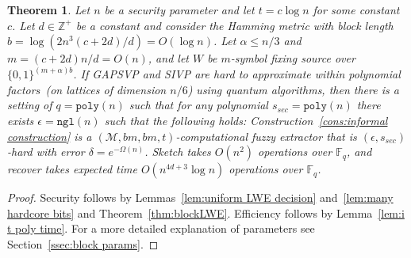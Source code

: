 \documentclass[11pt]{article}
\newcommand{\secref}[1]{\mbox{Section~\ref{#1}}}
\newcommand{\thref}[1]{\mbox{Theorem~\ref{#1}}}
\newcommand{\lemref}[1]{\mbox{Lemma~\ref{#1}}}
\newcommand{\consref}[1]{\mbox{Construction~\ref{#1}}}
\newcommand{\zo}{\ensuremath{\{0, 1\}}}
\newcommand{\Fq}{\ensuremath{\mathbb{F}_q}}
\newcommand{\poly}{\ensuremath{\mathtt{poly}}\xspace}
\newcommand{\ngl}{\ensuremath{\mathtt{ngl}}\xspace}
\newtheorem{theorem}{Theorem}[section]
\newcommand{\M}{\mathcal{M}}
\begin{document}
\begin{theorem}
\label{thm:lossless block sketch log}
Let $n$ be a security parameter and let $t = c\log n$ for some constant $c$.  Let $d\in\mathbb{Z}^+$ be a constant and consider the Hamming metric with block length $b = \log (2n^3 (c+2d)/d) = O(\log n)$.  Let $\alpha \leq n/3$ and $m=(c+2d)n/d = O(n)$, and let $W$ be $m$-symbol fixing source over $\zo^{(m+\alpha)b}$.  If GAPSVP and SIVP are hard to approximate within polynomial factors~(on lattices of dimension $n/6$) using quantum algorithms, then  there is a setting of $q = \poly(n)$ such that for any polynomial $s_{sec} = \poly(n)$
 there exists $\epsilon = \ngl(n)$ such that the following holds: 
\consref{cons:informal construction} is a $(\M, bm, bm, t)$-computational fuzzy extractor that is $(\epsilon, s_{sec})$-hard with error $\delta = e^{-\Omega(n)}$. Sketch takes $O(n^2)$ operations over $\Fq$, and recover takes expected time $O(n^{4d+3} \log n)$ operations over $\Fq$.
\end{theorem}

\begin{proof} Security follows by Lemmas~\ref{lem:uniform LWE decision} and~\ref{lem:many hardcore bits} and  \thref{thm:blockLWE}.  Efficiency follows by \lemref{lem:i t poly time}.  For a more detailed explanation of parameters see \secref{ssec:block params}.
\end{proof}

\end{document}
